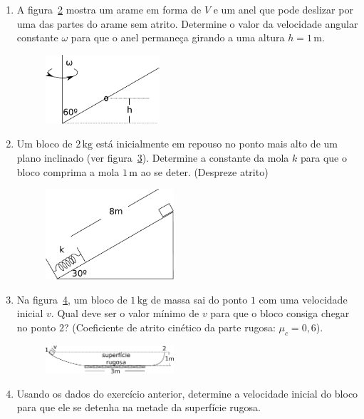 \documentclass[twocolumn=on,DIV=calc]{scrartcl}
\newcommand{\un}[1]{\mathrm{#1}}
\begin{document}
\begin{enumerate}
\begin{figure}[ht]
    \caption{}
    \label{fig:2}
  \end{figure}
\item A figura~\ref{fig:1} mostra um arame em forma de $V$ e um anel
  que pode deslizar por uma das partes do arame sem atrito. Determine
  o valor da velocidade angular constante $\omega$ para que o anel
  permaneça girando a uma altura $h=1\,\un{m}$.
  \begin{figure}[ht]
    \centering
    \includegraphics[width=0.4\textwidth,keepaspectratio]{lista5-questao1.pdf}
    \caption{}
    \label{fig:1}
  \end{figure}
\item Um bloco de $2\,\un{kg}$ está inicialmente em repouso no ponto
  mais alto de um plano inclinado (ver figura~\ref{fig:8}). Determine
  a constante da mola $k$ para que o bloco comprima a mola $1\,\un{m}$
  ao se deter. (Despreze atrito)
  \begin{figure}[ht]
    \centering
    \includegraphics[width=0.45\textwidth,keepaspectratio]{lista5-questao8.pdf}
    \caption{}
    \label{fig:8}
  \end{figure}
\item Na figura~\ref{fig:6}, um bloco de $1\,\un{kg}$ de massa sai do
  ponto $1$ com uma velocidade inicial $v$. Qual deve ser o valor
  mínimo de $v$ para que o bloco consiga chegar no ponto $2$?
  (Coeficiente de atrito cinético da parte rugosa: $\mu_c=0{,}6$).
  \begin{figure}[ht]
    \centering
    \includegraphics[width=0.45\textwidth,keepaspectratio]{lista5-questao6.pdf}
    \caption{}
    \label{fig:6}
  \end{figure}
\item Usando os dados do exercício anterior, determine a velocidade
  inicial do bloco para que ele se detenha na metade da superfície
  rugosa.
\end{enumerate}
\end{document}
